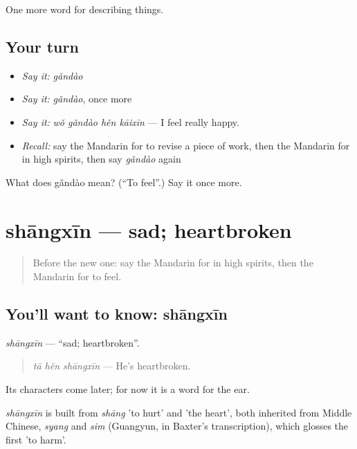 \begin{grammarlens}[title={What you've built}]
One more word for describing things.
\end{grammarlens}

\subsection*{Your turn}
\begin{itemize}
\raggedright
  \item \emph{Say it:} \emph{gǎndào}
  \item \emph{Say it:} \emph{gǎndào}, once more
  \item \emph{Say it:} \emph{wǒ gǎndào hěn kāixīn} — I feel really happy.
  \item \emph{Recall:} say the Mandarin for to revise a piece of work, then the Mandarin for in high spirits, then say \emph{gǎndào} again
\end{itemize}

\begin{tcolorbox}[breakable,colback=teal!4,colframe=teal!35!black,title={Before you move on}]
What does gǎndào mean? (\textquotedblleft{}To feel\textquotedblright{}.) Say it once more.
\end{tcolorbox}
\section[shāngxīn]{shāngxīn — sad; heartbroken}

\label{lesson:ZH-C252-shangxin}



\begin{quote}
Before the new one: say the Mandarin for in high spirits, then the Mandarin for to feel.
\end{quote}

\subsection*{You'll want to know: shāngxīn}
\emph{shāngxīn} — \textquotedblleft{}sad; heartbroken\textquotedblright{}.

\begin{quote}
\emph{tā hěn shāngxīn} — He's heartbroken.
\end{quote}

Its characters come later; for now it is a word for the ear.

\begin{cousinweb}
\emph{shāngxīn} is built from \emph{shāng} 'to hurt' and  'the heart', both inherited from Middle Chinese, \emph{syang} and \emph{sim} (Guangyun, in Baxter's transcription), which glosses the first 'to harm'.
\end{cousinweb}


